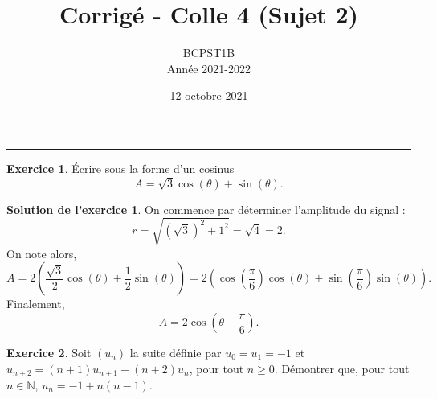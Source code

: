\documentclass[a4paper, 11pt,openany]{article}%
\title{Corrigé - Colle 4 (Sujet 2)}
\author{BCPST1B\\
Année 2021-2022}
\date{12 octobre 2021}
\theoremstyle{plain}
\theoremstyle{definition}
\newtheorem{exo}{Exercice}
\newtheorem{sol}{Solution de l'exercice}
\theoremstyle{remark}
\newcommand{\N}{\mathbb{N}}
\begin{document}
   \maketitle
      \rule{\linewidth}{0.5mm}



\begin{exo}
Écrire sous la forme d'un cosinus
\[ A = \sqrt{3} \cos(\theta) +  \sin (\theta).\]
\end{exo}
%
\begin{sol}
On commence par déterminer l'amplitude du signal :
\[ r = \sqrt{(\sqrt{3})^2 + 1^2} = \sqrt{4} = 2.\]
On note alors,
\[ A = 2 \left( \frac{\sqrt{3}}{2} \cos(\theta) + \frac{1}{2} \sin(\theta) \right)
= 2 \left( \cos \left( \frac{\pi}{6} \right) \cos(\theta) + \sin \left( \frac{\pi}{6} \right)  \sin(\theta) \right).\]
Finalement,
\[ A = 2 \cos \left( \theta + \frac{\pi}{6} \right).\]
\end{sol}

\begin{exo}
Soit $(u_n)$ la suite définie par $u_0 = u_1 = -1$ et $u_{n+2} = (n+1)u_{n+1} - (n+2) u_n$, pour tout $n \geqslant 0$. Démontrer que, pour tout $n \in \N$, $u_n = -1 + n(n-1)$.
\end{exo}
\end{document}
